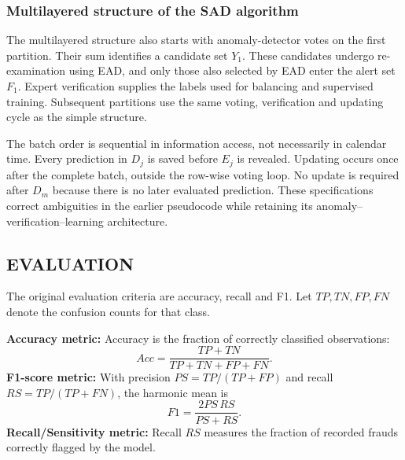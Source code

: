 \subsubsection*{Multilayered structure of the SAD algorithm}\label{sec4_3}
The multilayered structure also starts with anomaly-detector votes on the
first partition. Their sum identifies a candidate set $Y_1$. These
candidates undergo re-examination using EAD, and only those also selected
by EAD enter the alert set $F_1$. Expert verification supplies the labels
used for balancing and supervised training. Subsequent partitions use the
same voting, verification and updating cycle as the simple structure.



\begin{revised}
The batch order is sequential in information access, not necessarily in
calendar time. Every prediction in $D_j$ is saved before $E_j$ is revealed.
Updating occurs once after the complete batch, outside the row-wise voting
loop. No update is required after $D_m$ because there is no later evaluated
prediction. These specifications correct ambiguities in the earlier
pseudocode while retaining its anomaly--verification--learning architecture.
\end{revised}

\subsection{EVALUATION}\label{SSC:EVAL}
The original evaluation criteria are accuracy, recall and F1.
Let $TP,TN,FP,FN$ denote the confusion counts for that class.

\textbf{Accuracy metric:} Accuracy is the fraction of correctly classified
observations:
\[
Acc=\frac{TP+TN}{TP+TN+FP+FN}.
\]
\textbf{F1-score metric:} With precision $PS=TP/(TP+FP)$ and recall
$RS=TP/(TP+FN)$, the harmonic mean is
\[
F1=\frac{2PS\,RS}{PS+RS}.
\]
\textbf{Recall/Sensitivity metric:} Recall $RS$ measures the fraction of
recorded frauds correctly flagged by the model.

